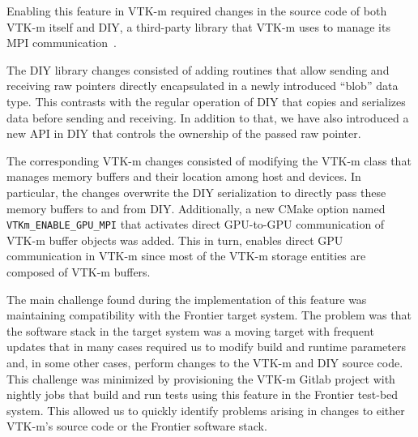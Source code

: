 Enabling this feature in VTK-m required changes in the source code of both VTK-m itself and DIY, a third-party library that VTK-m uses to manage its MPI communication~\cite{Peterka2011,Morozov2016}.

The DIY library changes consisted of adding routines that allow sending and receiving raw pointers directly encapsulated in a newly introduced ``blob'' data type. This contrasts with the regular operation of DIY that copies and serializes data before sending and receiving. In addition to that, we have also introduced a new API in DIY that controls the ownership of the passed raw pointer.

The corresponding VTK-m changes consisted of modifying the VTK-m class that manages memory buffers and their location among host and devices.
In particular, the changes overwrite the DIY serialization to directly pass these memory buffers to and from DIY.
Additionally, a new CMake option named \texttt{VTKm\_ENABLE\_GPU\_MPI} that activates direct GPU-to-GPU communication of VTK-m buffer objects was added.
This in turn, enables direct GPU communication in VTK-m since most of the VTK-m storage entities are composed of VTK-m buffers. 

The main challenge found during the implementation of this feature was maintaining compatibility with the Frontier target system.
The problem was that the software stack in the target system was a moving target with frequent updates that in many cases required us to modify build and runtime parameters and, in some other cases, perform changes to the VTK-m and DIY source code.
This challenge was minimized by provisioning the VTK-m Gitlab project with nightly jobs that build and run tests using this feature in the Frontier test-bed system.
This allowed us to quickly identify problems arising in changes to either VTK-m's source code or the Frontier software stack.
